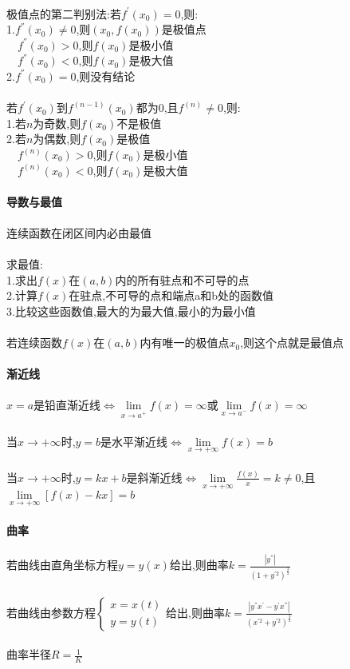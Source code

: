 \documentclass{article}
\begin{document}
\begin{flushleft}
	~\\
	极值点的第二判别法:若$f^{'}(x_0)=0$,则:\\
	1.$f^{''}(x_0)\neq 0$,则$(x_0,f(x_0))$是极值点\\
	\ \ $f^{''}(x_0)>0$,则$f(x_0)$是极小值\\
	\ \ $f^{''}(x_0)<0$,则$f(x_0)$是极大值\\
	2.$f^{''}(x_0)=0$,则没有结论\\
	~\\
	若$f^{'}(x_0)$到$f^{(n-1)}(x_0)$都为0,且$f^{(n)}\neq 0$,则:\\
	1.若$n$为奇数,则$f(x_0)$不是极值\\
	2.若$n$为偶数,则$f(x_0)$是极值\\
	\ \ $f^{(n)}(x_0)>0$,则$f(x_0)$是极小值\\
	\ \ $f^{(n)}(x_0)<0$,则$f(x_0)$是极大值\\
	~\\ \textbf{导数与最值} \\~\\
	连续函数在闭区间内必由最值\\
	~\\
	求最值:\\
	1.求出$f(x)$在$(a,b)$内的所有驻点和不可导的点\\
	2.计算$f(x)$在驻点,不可导的点和端点a和b处的函数值\\
	3.比较这些函数值,最大的为最大值,最小的为最小值\\
	~\\
	若连续函数$f(x)$在$(a,b)$内有唯一的极值点$x_0$,则这个点就是最值点\\
	~\\ \textbf{渐近线} \\~\\
	$x=a$是铅直渐近线$\Leftrightarrow \lim\limits_{x\to a^+}f(x)=\infty$或$\lim\limits_{x\to a^-}f(x)=\infty$\\
	~\\
	当$x\to +\infty$时,$y=b$是水平渐近线$\Leftrightarrow \lim\limits_{x\to +\infty}f(x)=b$\\
	~\\
	当$x\to +\infty$时,$y=kx+b$是斜渐近线$\Leftrightarrow \lim\limits_{x\to +\infty}\frac{f(x)}{x}=k\neq 0$,且$\lim\limits_{x\to +\infty}[f(x)-kx]=b$\\
	~\\ \textbf{曲率} \\~\\
	若曲线由直角坐标方程$y=y(x)$给出,则曲率$k=\frac{|y^{''}|}{(1+y^{'2})^{\frac{3}{2}}}$\\
	~\\
	若曲线由参数方程$\left\{
	\begin{array}{rcl}
	x=x(t)\\
	y=y(t)
	\end{array} \right.$给出,则曲率$k=\frac{|y^{''}x^{'}-y^{'}x^{''}|}{(x^{'2}+y^{'2})^{\frac{3}{2}}}$\\
	~\\
	曲率半径$R=\frac{1}{K}$\\
\end{flushleft}
\end{document}
